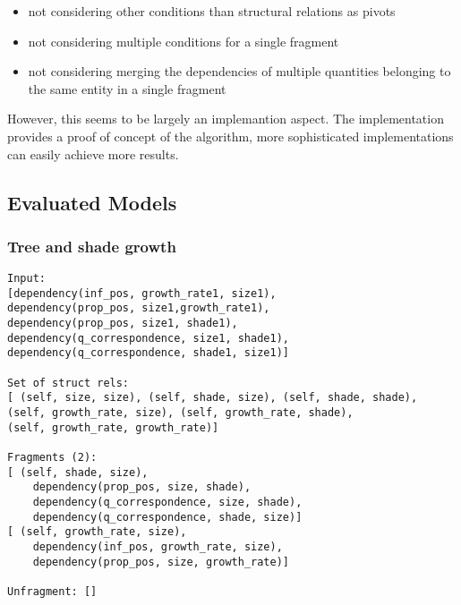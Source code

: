 \documentclass{article}
\begin{document}
\begin{itemize}

\item not considering other conditions than structural relations as pivots

\item not considering multiple conditions for a single fragment

\item not considering merging the dependencies of multiple quantities belonging
	to the same entity in a single fragment

\end{itemize}

However, this seems to be largely an implemantion aspect. The implementation
provides a proof of concept of the algorithm, more sophisticated
implementations can easily achieve more results.

\subsection{Evaluated Models}


\subsubsection{Tree and shade growth} 

\begin{verbatim}
Input: 
[dependency(inf_pos, growth_rate1, size1), 
dependency(prop_pos, size1,growth_rate1), 
dependency(prop_pos, size1, shade1),
dependency(q_correspondence, size1, shade1), 
dependency(q_correspondence, shade1, size1)]

Set of struct rels: 
[ (self, size, size), (self, shade, size), (self, shade, shade), 
(self, growth_rate, size), (self, growth_rate, shade), 
(self, growth_rate, growth_rate)]

Fragments (2): 
[ (self, shade, size), 
	dependency(prop_pos, size, shade),
	dependency(q_correspondence, size, shade), 
	dependency(q_correspondence, shade, size)] 
[ (self, growth_rate, size),
	dependency(inf_pos, growth_rate, size),
	dependency(prop_pos, size, growth_rate)]

Unfragment: []
\end{verbatim}
\end{document}
